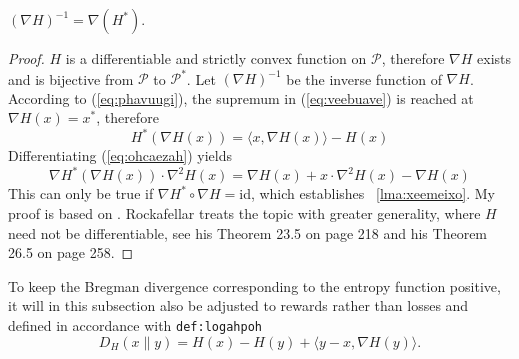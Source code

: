 \documentclass[12pt]{article}
\begin{document}
\begin{lemma}
  \label{lma:xeemeixo}
  $\left(\nabla{}H\right)^{-1}=\nabla\left(H^{\ast}\right)$.
\end{lemma}
\begin{proof}
  \label{prf:ezegheop}
$H$ is a differentiable and strictly convex function on $\mathcal{P}$,
therefore $\nabla{}H$ exists and is bijective from $\mathcal{P}$ to
$\mathcal{P}^{\ast}$. Let $(\nabla{}H)^{-1}$ be the inverse function
of $\nabla{}H$. According to (\ref{eq:phavuugi}), the supremum in
(\ref{eq:veebuave}) is reached at $\nabla{}H(x)=x^{\ast}$, therefore
\begin{equation}
  \label{eq:ohcaezah}
  H^{\ast}(\nabla{}H(x))=\langle{}x,\nabla{}H(x)\rangle-H(x)
\end{equation}
Differentiating (\ref{eq:ohcaezah}) yields
\begin{equation}
  \label{eq:uephaele}
\nabla{}H^{\ast}(\nabla{}H(x))\cdot\nabla^{2}H(x)=\nabla{}H(x)+x\cdot\nabla^{2}H(x)-\nabla{}H(x)
\end{equation}
This can only be true if $\nabla{}H^{\ast}\circ\nabla{}H=$id, which
establishes {\emma}~\ref{lma:xeemeixo}. My proof is based on
. Rockafellar treats the topic with greater
generality, where $H$ need not be differentiable, see his Theorem 23.5
on page 218 and his Theorem 26.5 on page 258.
\end{proof}


To keep the Bregman divergence corresponding to the entropy function
positive, it will in this subsection also be adjusted to rewards
rather than losses and defined in accordance with
\texttt{def:logahpoh}
\begin{equation}
  \label{eq:pooceiyu}
  D_{H}(x\|y)=H(x)-H(y)+\langle{}y-x,\nabla{}H(y)\rangle.
\end{equation}
\end{document}
